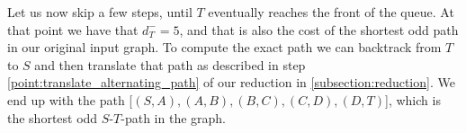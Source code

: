 

Let us now skip a few steps, until $T$ eventually reaches the front of the queue. At that point we have that $d^-_T = 5$, and that is also the cost of the shortest odd path in our original input graph. To compute the exact path we can backtrack from $T$ to $S$ and then translate that path as described in step \ref{point:translate_alternating_path} of our reduction in \ref{subsection:reduction}. We end up with the path [$(S,A),(A,B),(B,C),(C,D),(D,T)$], which is the shortest odd $S$-$T$-path in the graph.
